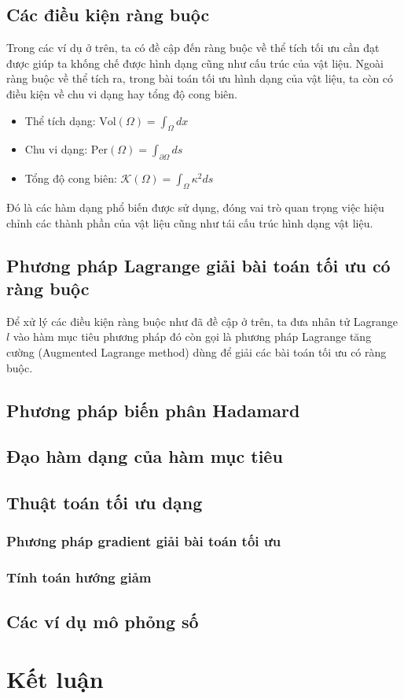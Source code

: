 \documentclass[
12pt, %
oneside, %
english, %
onehalfspacing, %
nolistspacing, %
headsepline, %
addchap,
]{MastersDoctoralThesis} %
\begin{document}
\subsection*{Các điều kiện ràng buộc}
Trong các ví dụ ở trên, ta có đề cập đến ràng buộc về thể tích tối ưu cần đạt được giúp ta khống chế được hình dạng cũng như cấu trúc của vật liệu. Ngoài ràng buộc về thể tích ra, trong bài toán tối ưu hình dạng của vật liệu, ta còn có điều kiện về chu vi dạng hay tổng độ cong biên.
\begin{itemize}
\item Thể tích dạng: $\text{Vol}(\Omega)=\int_\Omega dx$
\item Chu vi dạng: $\text{Per}(\Omega)=\int_{\partial\Omega} ds$
\item Tổng độ cong biên: $\mathcal{K}(\Omega)=\int_\Omega\kappa^2ds$
\end{itemize}
Đó là các hàm dạng phổ biến được sử dụng, đóng vai trò quan trọng việc hiệu chỉnh các thành phần của vật liệu cũng như tái cấu trúc hình dạng vật liệu.
\subsection*{Phương pháp Lagrange giải bài toán tối ưu có ràng buộc}
Để xử lý các điều kiện ràng buộc như đã đề cập ở trên, ta đưa nhân tử Lagrange $l$ vào hàm mục tiêu phương pháp đó còn gọi là phương pháp Lagrange tăng cường (Augmented Lagrange method) dùng để giải các bài toán tối ưu có ràng buộc. 
\subsection*{Phương pháp biến phân Hadamard}
\subsection*{Đạo hàm dạng của hàm mục tiêu}
\subsection*{Thuật toán tối ưu dạng}
\subsubsection*{Phương pháp gradient giải bài toán tối ưu}
\subsubsection*{Tính toán hướng giảm}
\subsection{Các ví dụ mô phỏng số}

\section{Kết luận}
% 
%



\end{document}
